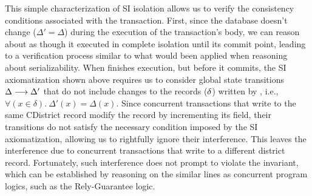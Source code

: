 
This simple characterization of SI isolation allows us to verify the
consistency conditions associated with the  transaction.
First, since the database doesn't change ($\Delta' = \Delta$) during
the execution of the transaction's body, we can reason about
 as though it executed in complete isolation until its
commit point, leading to a verification process similar to what would
been applied when reasoning about serializability.  When
 finishes execution, but before it commits, the SI
axiomatization shown above requires us to consider global state
transitions $\Delta \longrightarrow \Delta'$ that do not include changes
to the records ($\delta$) written by , i.e.,
$\forall(x\in\delta).~\Delta'(x) = \Delta(x)$. Since concurrent
 transactions that write to the same C{District} record
modify the record by incrementing its  field,
their transitions do not satisfy the necessary condition imposed by
the SI axiomatization, allowing us to rightfully ignore their
interference. This leaves the interference due to concurrent
 transactions that write to a different district record. 
Fortunately, such interference does not prompt  to
violate the invariant, which can be established by reasoning on the
similar lines as concurrent program logics, such as the Rely-Guarantee
logic.

